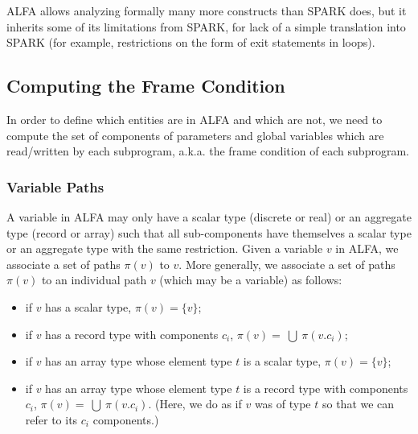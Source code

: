 \documentclass{article}
\newcounter{example}
\newcommand{\bigunion}{~\bigcup~}
\newcommand{\vpath}[1]{\ensuremath{\pi(#1)}\xspace}
\begin{document}
ALFA allows analyzing formally many more constructs than SPARK does, but it
inherits some of its limitations from SPARK, for lack of a simple translation
into SPARK (for example, restrictions on the form of exit statements in loops).

\subsection{Computing the Frame Condition}
\label{sub:data-flow}

In order to define which entities are in ALFA and which are not, we need to
compute the set of components of parameters and global variables which are
read/written by each subprogram, a.k.a. the frame condition of each subprogram.

\subsubsection{Variable Paths}
\label{sub:variable-path}

A variable in ALFA may only have a scalar type (discrete or real) or an
aggregate type (record or array) such that all sub-components have themselves a
scalar type or an aggregate type with the same restriction. Given a variable
$v$ in ALFA, we associate a set of paths \vpath{v} to $v$. More generally, we
associate a set of paths \vpath{v} to an individual path $v$ (which may be a
variable) as follows:
\begin{itemize}
\item if $v$ has a scalar type, $\vpath{v} = \{v\}$;
\item if $v$ has a record type with components $c_i$, 
  $\vpath{v} = \bigunion \vpath{v.c_i}$;
\item if $v$ has an array type whose element type $t$ is a scalar type,
  $\vpath{v} = \{v\}$;
\item if $v$ has an array type whose element type $t$ is a record type with
  components $c_i$, $\vpath{v} = \bigunion \vpath{v.c_i}$. (Here, we do as if $v$
  was of type $t$ so that we can refer to its $c_i$ components.)
\end{itemize}
\end{document}
